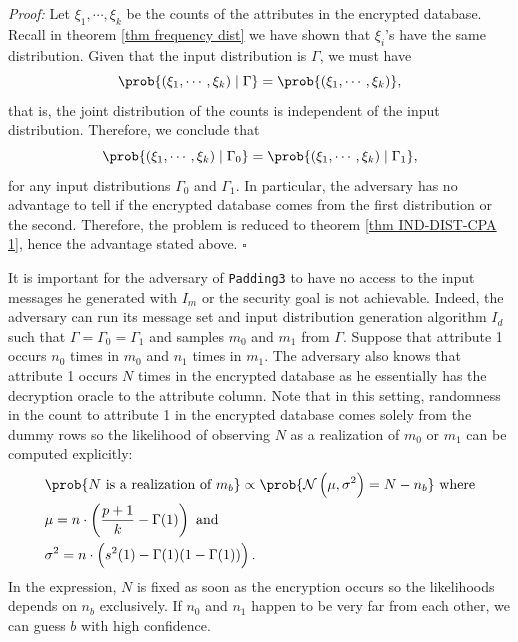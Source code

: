 \textit{Proof:} Let $\xi_1, \cdots, \xi_k$ be the counts of the attributes in the encrypted database. Recall in theorem \ref{thm frequency dist} we have shown that $\xi_i$'s have the same distribution. Given that the input distribution is $\Gamma$, we must have
\begin{equation}
	\prob{(\xi_1, \cdots, \xi_k) \mid \Gamma} = \prob{(\xi_1, \cdots, \xi_k)}, \label{indep of dist}
\end{equation}
that is, the joint distribution of the counts is independent of the input distribution. Therefore, we conclude that
\begin{equation*}
	\prob{(\xi_1, \cdots, \xi_k) \mid \Gamma_0} = \prob{(\xi_1, \cdots, \xi_k) \mid \Gamma_1},
\end{equation*}
for any input distributions $\Gamma_0$ and $\Gamma_1$. In particular, the adversary has no advantage to tell if the encrypted database comes from the first distribution or the second. Therefore, the problem is reduced to theorem \ref{thm IND-DIST-CPA 1}, hence the advantage stated above. $\square$


It is important for the adversary of \texttt{Padding3} to have no access to the input messages he generated with $I_m$ or the security goal is not achievable. Indeed, the adversary can run its message set and input distribution generation algorithm $I_d$ such that $\Gamma = \Gamma_0 = \Gamma_1$ and samples $m_0$ and $m_1$ from $\Gamma$. Suppose that attribute 1 occurs $n_0$ times in $m_0$ and $n_1$ times in $m_1$. The adversary also knows that attribute 1 occurs $N$ times in the encrypted database as he essentially has the decryption oracle to the attribute column. Note that in this setting, randomness in the count to attribute 1 in the encrypted database comes solely from the dummy rows so the likelihood of observing $N$ as a realization of $m_0$ or $m_1$ can be computed explicitly:
\begin{align*}
	& \prob{N \text{ is a realization of } m_b} \propto \prob{\mathcal{N}\left( \mu, \sigma^2 \right) = N - n_b} \text{ where} \\
	& \mu = n \cdot \left( \frac{p+1}{k} - \Gamma(1) \right) \text{ and } \\
	& \sigma^2 = n \cdot \left( s^2(1) - \Gamma(1) (1 - \Gamma(1)) \right).
\end{align*}
In the expression, $N$ is fixed as soon as the encryption occurs so the likelihoods depends on $n_b$ exclusively. If $n_0$ and $n_1$ happen to be very far from each other, we can guess $b$ with high confidence.

